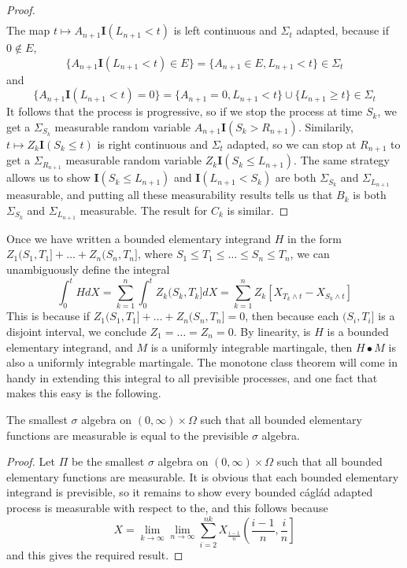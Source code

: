 \begin{proof}
\begin{align*}
    \end{align*}
    The map $t \mapsto A_{n+1} \mathbf{I}(L_{n+1} < t)$ is left continuous and $\Sigma_t$ adapted, because if $0 \not \in E$,
    \[ \{ A_{n+1} \mathbf{I}(L_{n+1} < t) \in E \} = \{ A_{n+1} \in E, L_{n+1} < t \} \in \Sigma_t \]
    and
    \[ \{ A_{n+1} \mathbf{I}(L_{n+1} < t) = 0 \} = \{ A_{n+1} = 0, L_{n+1} < t \} \cup \{ L_{n+1} \geq t \} \in \Sigma_t \]
    It follows that the process is progressive, so if we stop the process at time $S_k$, we get a $\Sigma_{S_k}$ measurable random variable $A_{n+1} \mathbf{I}(S_k > R_{n+1})$. Similarily, $t \mapsto Z_k \mathbf{I}(S_k \leq t)$ is right continuous and $\Sigma_t$ adapted, so we can stop at $R_{n+1}$ to get a $\Sigma_{R_{n+1}}$ measurable random variable $Z_k \mathbf{I}(S_k \leq L_{n+1})$. The same strategy allows us to show $\mathbf{I}(S_k \leq L_{n+1})$ and $\mathbf{I}(L_{n+1} < S_k)$ are both $\Sigma_{S_k}$ and $\Sigma_{L_{n+1}}$ measurable, and putting all these measurability results tells us that $B_k$ is both $\Sigma_{S_k}$ and $\Sigma_{L_{n+1}}$ measurable. The result for $C_k$ is similar.
\end{proof}

Once we have written a bounded elementary integrand $H$ in the form $Z_1(S_1,T_1] + \dots + Z_n(S_n,T_n]$, where $S_1 \leq T_1 \leq \dots \leq S_n \leq T_n$, we can unambiguously define the integral
%
\[ \int_0^t HdX = \sum_{k = 1}^n \int_0^t Z_k(S_k,T_k] dX = \sum_{k = 1}^n Z_k[X_{T_k \wedge t} - X_{S_k \wedge t}] \]
%
This is because if $Z_1(S_1,T_1] + \dots + Z_n(S_n,T_n] = 0$, then because each $(S_i,T_i]$ is a disjoint interval, we conclude $Z_1 = \dots = Z_n = 0$. By linearity, is $H$ is a bounded elementary integrand, and $M$ is a uniformly integrable martingale, then $H \bullet M$ is also a uniformly integrable martingale. The monotone class theorem will come in handy in extending this integral to all previsible processes, and one fact that makes this easy is the following.

\begin{lemma}
    The smallest $\sigma$ algebra on $(0,\infty) \times \Omega$ such that all bounded elementary functions are measurable is equal to the previsible $\sigma$ algebra.
\end{lemma}
\begin{proof}
    Let $\Pi$ be the smallest $\sigma$ algebra on $(0,\infty) \times \Omega$ such that all bounded elementary functions are measurable. It is obvious that each bounded elementary integrand is previsible, so it remains to show every bounded c\'{a}gl\'{a}d adapted process is measurable with respect to the, and this follows because
    \[ X = \lim_{k \to \infty} \lim_{n \to \infty} \sum_{i = 2}^{nk} X_{\frac{i-1}{n}} \left( \frac{i-1}{n}, \frac{i}{n} \right] \]
    and this gives the required result.
\end{proof}

